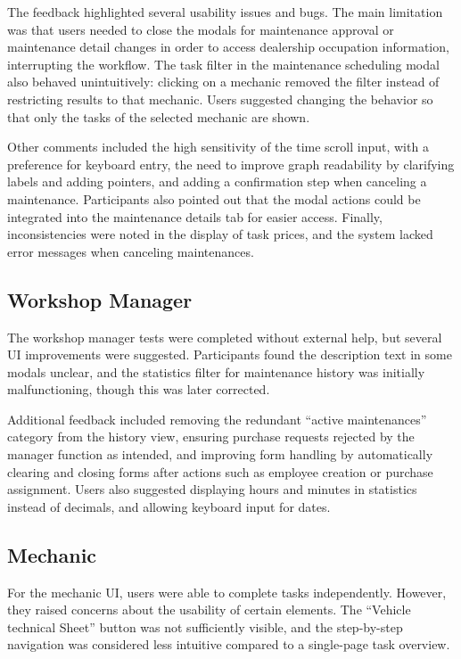 The feedback highlighted several usability issues and bugs. The main limitation was that users needed to close the modals for maintenance approval or maintenance detail changes in order to access dealership occupation information, interrupting the workflow. The task filter in the maintenance scheduling modal also behaved unintuitively: clicking on a mechanic removed the filter instead of restricting results to that mechanic. Users suggested changing the behavior so that only the tasks of the selected mechanic are shown.

Other comments included the high sensitivity of the time scroll input, with a preference for keyboard entry, the need to improve graph readability by clarifying labels and adding pointers, and adding a confirmation step when canceling a maintenance. Participants also pointed out that the modal actions could be integrated into the maintenance details tab for easier access. Finally, inconsistencies were noted in the display of task prices, and the system lacked error messages when canceling maintenances.

\subsection{Workshop Manager}

The workshop manager tests were completed without external help, but several \ac{UI} improvements were suggested. Participants found the description text in some modals unclear, and the statistics filter for maintenance history was initially malfunctioning, though this was later corrected.

Additional feedback included removing the redundant “active maintenances” category from the history view, ensuring purchase requests rejected by the manager function as intended, and improving form handling by automatically clearing and closing forms after actions such as employee creation or purchase assignment. Users also suggested displaying hours and minutes in statistics instead of decimals, and allowing keyboard input for dates.

\subsection{Mechanic}

For the mechanic \ac{UI}, users were able to complete tasks independently. However, they raised concerns about the usability of certain elements. The “Vehicle technical Sheet” button was not sufficiently visible, and the step-by-step navigation was considered less intuitive compared to a single-page task overview.

